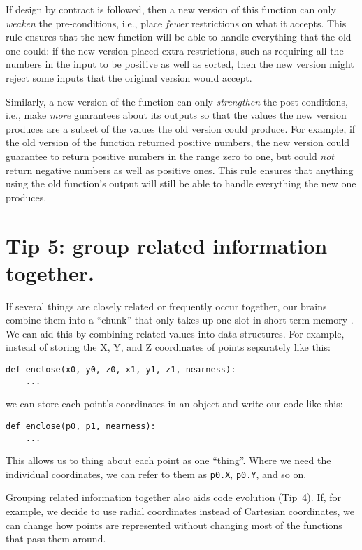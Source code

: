 \documentclass[10pt,letterpaper]{article}
\begin{document}
If design by contract is followed,
then a new version of this function can only \emph{weaken} the pre-conditions,
i.e.,
place \emph{fewer} restrictions on what it accepts.
This rule ensures that the new function will be able to handle
everything that the old one could:
if the new version placed extra restrictions,
such as requiring all the numbers in the input to be positive as well as sorted,
then the new version might reject some inputs that the original version would accept.

Similarly,
a new version of the function can only \emph{strengthen} the post-conditions,
i.e.,
make \emph{more} guarantees about its outputs
so that the values the new version produces are a subset of the values the old version could produce.
For example,
if the old version of the function returned positive numbers,
the new version could guarantee to return positive numbers in the range zero to one,
but could \emph{not} return negative numbers as well as positive ones.
This rule ensures that anything using the old function's output
will still be able to handle everything the new one produces.

\section*{Tip 5: group related information together.}

If several things are closely related or frequently occur together,
our brains combine them into a ``chunk''
that only takes up one slot in short-term memory \cite{Thalmann2019}.
We can aid this by combining related values into data structures.
For example,
instead of storing the X, Y, and Z coordinates of points separately like this:

\begin{lstlisting}
def enclose(x0, y0, z0, x1, y1, z1, nearness):
    ...
\end{lstlisting}

\noindent
we can store each point's coordinates in an object
and write our code like this:

\begin{lstlisting}
def enclose(p0, p1, nearness):
    ...
\end{lstlisting}

\noindent
This allows us to thing about each point as one ``thing''.
Where we need the individual coordinates,
we can refer to them as \texttt{p0.X}, \texttt{p0.Y}, and so on.

Grouping related information together also aids code evolution (Tip~4).
If, for example, we decide to use radial coordinates instead of Cartesian coordinates,
we can change how points are represented without changing most of the functions that pass them around.
\end{document}
